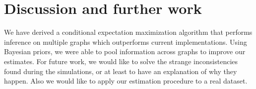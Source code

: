 \documentclass[a4paper, 11pt, oneside]{report}
\newcommand{\1}{\mathds{1}}
\begin{document}
\chapter{Discussion and further work}
We have derived a conditional expectation maximization algorithm that performs inference on multiple graphs
which outperforms current implementations. Using Bayesian priors, we were able to pool information across
graphs to improve our estimates. 
For future work, we would like to solve the strange inconsistencies found during the simulations, or at 
least to have an explanation of why they happen.
Also we would like to apply our estimation procedure to a real dataset.

\cleardoublepage
{}
{}
\printbibliography
\end{document}
